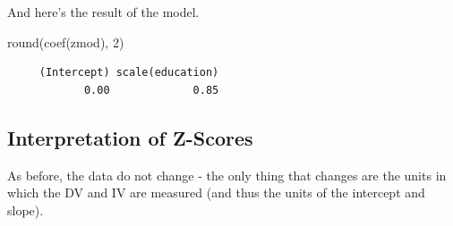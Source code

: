 \documentclass[
  letterpaper,
  DIV=11,
  numbers=noendperiod,
  oneside]{scrreprt}
\newenvironment{Shaded}{\begin{snugshade}}{\end{snugshade}}
\newcommand{\DecValTok}[1]{\textcolor[rgb]{0.68,0.00,0.00}{#1}}
\newcommand{\FunctionTok}[1]{\textcolor[rgb]{0.28,0.35,0.67}{#1}}
\newcommand{\NormalTok}[1]{\textcolor[rgb]{0.00,0.23,0.31}{#1}}
\begin{document}
And here's the result of the model.

\begin{Shaded}
\begin{Highlighting}[]
\FunctionTok{round}\NormalTok{(}\FunctionTok{coef}\NormalTok{(zmod), }\DecValTok{2}\NormalTok{)}
\end{Highlighting}
\end{Shaded}

\begin{verbatim}
     (Intercept) scale(education) 
            0.00             0.85 
\end{verbatim}

\subsection{Interpretation of
Z-Scores}\label{interpretation-of-z-scores}

As before, the data do not change - the only thing that changes are the
units in which the DV and IV are measured (and thus the units of the
intercept and slope).~
\end{document}
